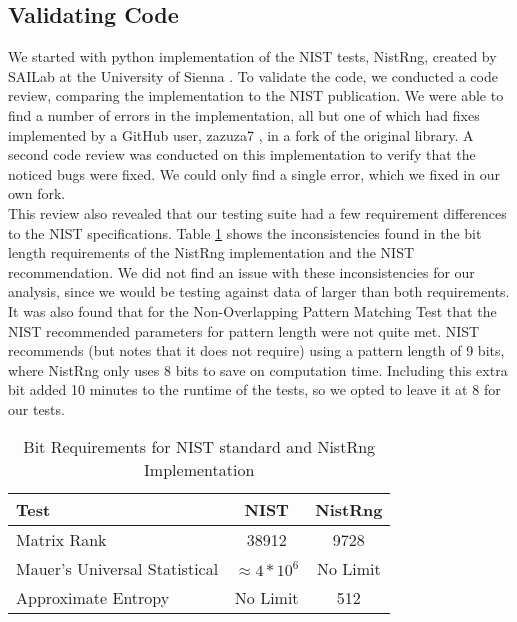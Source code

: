 \documentclass[11pt,letterpaper,conference]{IEEEtran}
\begin{document}
\subsection{Validating Code}
We started with python implementation of the NIST tests, NistRng, created by SAILab at the University of Sienna \cite{SAILab}. To validate the code, we conducted a code review, comparing the implementation to the NIST publication. We were able to find a number of errors in the implementation, all but one of which had fixes implemented by a GitHub user, zazuza7 \cite{zazuza7}, in a fork of the original library. A second code review was conducted on this implementation to verify that the noticed bugs were fixed. We could only find a single error, which we fixed in our own fork.\\

This review also revealed that our testing suite had a few requirement differences to the NIST specifications. Table \ref{table:Bits} shows the inconsistencies found in the bit length requirements of the NistRng implementation and the NIST recommendation. We did not find an issue with these inconsistencies for our analysis, since we would be testing against data of larger than both requirements. It was also found that for the Non-Overlapping Pattern Matching Test that the NIST recommended parameters for pattern length were not quite met. NIST recommends (but notes that it does not require) using a pattern length of 9 bits, where NistRng only uses 8 bits to save on computation time. Including this extra bit added 10 minutes to the runtime of the tests, so we opted to leave it at 8 for our tests.

\begin{table}[htp]
\centering
\begin{tabular}{|l||c|c|}
\hline
Test & NIST & NistRng \\
\hline
Matrix Rank  & 38912 &  9728\\
Mauer's Universal Statistical & $\approx 4*10^6$ & No Limit\\
Approximate Entropy & No Limit & 512\\
\hline
\end{tabular}\\
\caption{Bit Requirements for NIST standard and NistRng Implementation}
\label{table:Bits}
\end{table}
\end{document}
